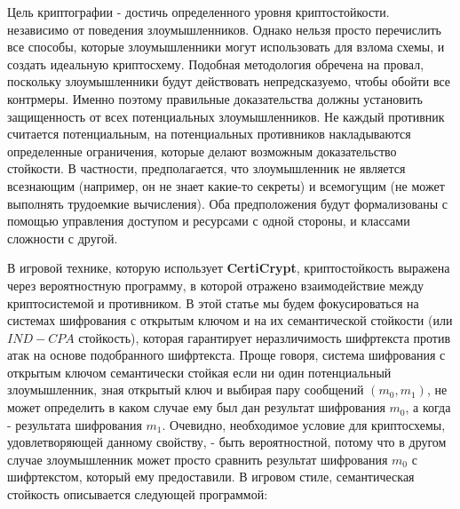 \documentclass[a4paper,12pt]{report}
\begin{document}
Цель криптографии - достичь определенного уровня криптостойкости. независимо от поведения злоумышленников. Однако нельзя просто перечислить все способы, которые злоумышленники могут использовать для взлома схемы, и создать идеальную криптосхему. Подобная методология обречена на провал, поскольку злоумышленники будут действовать непредсказуемо, чтобы обойти все контрмеры. Именно поэтому правильные доказательства должны установить защищенность от всех потенциальных злоумышленников. Не каждый противник считается потенциальным, на потенциальных противников накладываются определенные ограничения, которые делают возможным доказательство стойкости. В частности, предполагается, что злоумышленник не является всезнающим (например, он не знает какие-то секреты) и всемогущим (не может выполнять трудоемкие вычисления). Оба предположения будут формализованы с помощью управления доступом и ресурсами с одной стороны, и классами сложности с другой.
\par
В игровой технике, которую использует \textbf{CertiCrypt}, криптостойкость выражена через вероятностную программу, в которой отражено взаимодействие между криптосистемой и противником. В этой статье мы будем фокусироваться на системах шифрования с открытым ключом и на их семантической стойкости (или $IND-CPA$ стойкость), которая гарантирует неразличимость шифртекста против атак на основе подобранного шифртекста. Проще говоря, система шифрования с открытым ключом семантически стойкая если ни один потенциальный злоумышленник, зная открытый ключ и выбирая пару сообщений $(m_0, m_1)$, не может определить в каком случае ему был дан результат шифрования $m_0$, а когда - результата шифрования $m_1$. Очевидно, необходимое условие для криптосхемы, удовлетворяющей данному свойству, - быть вероятностной, потому что в другом случае злоумышленник может просто сравнить результат шифрования $m_0$ с шифртекстом, который ему предоставили. В игровом стиле, семантическая стойкость описывается следующей программой:
\begin{figure}
\centering
{}
\end{figure}
\end{document}
